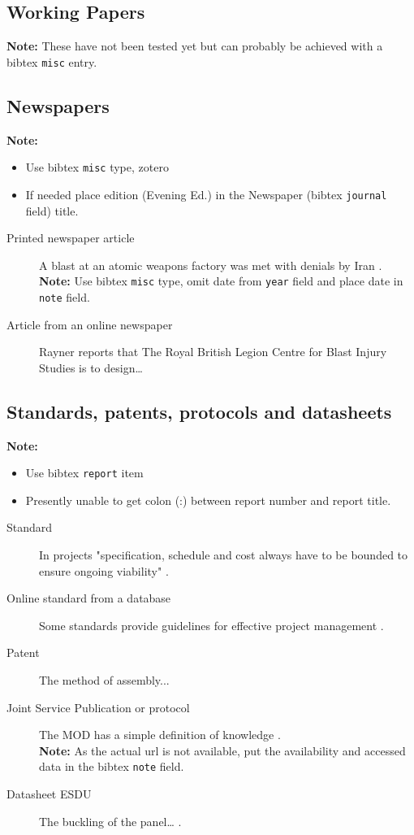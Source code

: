 \documentclass[12pt,oneside]{book} %
\begin{document}
\subsection{Working Papers}
\textbf{Note:} These have not been tested yet but can probably be achieved with a bibtex \verb#misc# entry.

\subsection{Newspapers}
\label{Sec:Newspapers}
\textbf{Note:} 
\begin{itemize}
\item Use bibtex \verb#misc# type, zotero 
\item If needed place edition (\eg Evening Ed.) in the Newspaper (bibtex \verb#journal# field) title.
\end{itemize}
\begin{description}
\item[Printed newspaper article] A blast at an atomic weapons factory was
met with denials by Iran \cite{frenkel_europe_nodate}.\\
\textbf{Note:} Use bibtex \texttt{misc} type, omit date from \texttt{year} field and place date in \texttt{note} field. 
\item[Article from an online newspaper]  Rayner \cite{rayner_combat_2011} reports that The Royal British Legion Centre for Blast Injury Studies is
to design…
\end{description}


\subsection{Standards, patents, protocols and datasheets}
\label{sec:standards}
\textbf{Note:} 
\begin{itemize}
\item Use bibtex \texttt{report} item
\item Presently unable to get colon (:) between report number and report title.
\end{itemize}
\begin{description}
\item[Standard] In projects "specification, schedule and
cost always have to be bounded to ensure
ongoing viability" \cite{british_standards_institution_project_2010}.
\item[Online standard from a database] Some standards provide guidelines for effective project management \cite{british_standards_institution_project_2010}.
\item[Patent] The method of assembly... \cite{hodge_rear_2008}
\item[Joint Service Publication or protocol] The MOD has a simple definition of knowledge \cite{great_britain_ministry_of_defence_retaining_2011}.\\
\textbf{Note:} As the actual url is not available, put the availability and accessed data in the bibtex \texttt{note} field.
\item[Datasheet \eg ESDU] The buckling of the panel… \cite{esdu_elastic_2008}.
\end{description}
\end{document}
